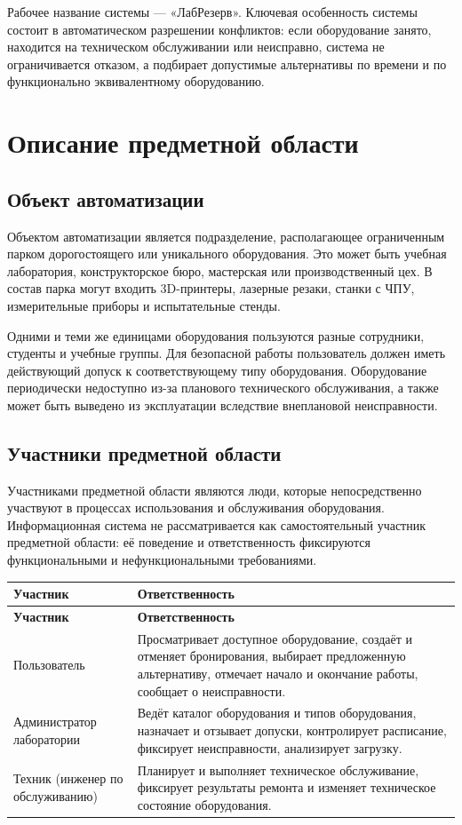 \documentclass[12pt,a4paper]{article}
\newcommand{\systemname}{«ЛабРезерв»}
\begin{document}
Рабочее название системы --- \systemname. Ключевая особенность системы состоит
в автоматическом разрешении конфликтов: если оборудование занято, находится на
техническом обслуживании или неисправно, система не ограничивается отказом, а
подбирает допустимые альтернативы по времени и по функционально эквивалентному
оборудованию.

\section{Описание предметной области}

\subsection{Объект автоматизации}

Объектом автоматизации является подразделение, располагающее ограниченным
парком дорогостоящего или уникального оборудования. Это может быть учебная
лаборатория, конструкторское бюро, мастерская или производственный цех. В состав
парка могут входить 3D-принтеры, лазерные резаки, станки с ЧПУ, измерительные
приборы и испытательные стенды.

Одними и теми же единицами оборудования пользуются разные сотрудники, студенты
и учебные группы. Для безопасной работы пользователь должен иметь действующий
допуск к соответствующему типу оборудования. Оборудование периодически
недоступно из-за планового технического обслуживания, а также может быть
выведено из эксплуатации вследствие внеплановой неисправности.

\subsection{Участники предметной области}

Участниками предметной области являются люди, которые непосредственно участвуют
в процессах использования и обслуживания оборудования. Информационная система не
рассматривается как самостоятельный участник предметной области: её поведение и
ответственность фиксируются функциональными и нефункциональными требованиями.

\begin{longtable}{|p{}|p{}|}
\hline
\textbf{Участник} & \textbf{Ответственность} \\
\hline
\endfirsthead
\hline
\textbf{Участник} & \textbf{Ответственность} \\
\hline
\endhead
Пользователь & Просматривает доступное оборудование, создаёт и отменяет
бронирования, выбирает предложенную альтернативу, отмечает начало и окончание
работы, сообщает о неисправности. \\
\hline
Администратор лаборатории & Ведёт каталог оборудования и типов оборудования,
назначает и отзывает допуски, контролирует расписание, фиксирует неисправности,
анализирует загрузку. \\
\hline
Техник (инженер по обслуживанию) & Планирует и выполняет техническое
обслуживание, фиксирует результаты ремонта и изменяет техническое состояние
оборудования. \\
\hline
\end{longtable}
\end{document}
